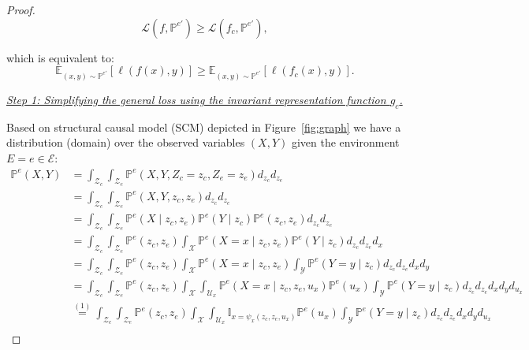 \begin{proof}
\begin{equation}
\mathcal{L}\left(f, \mathbb{P}^{e'}\right)
\geq \mathcal{L}\left(f_c, \mathbb{P}^{e'}\right),
\end{equation}

which is equivalent to:
\begin{equation}
\mathbb{E}_{(x,y)\sim\mathbb{P}^{e'}}\left[\ell\left(f\left(x\right),y\right)\right]
\geq \mathbb{E}_{(x,y)\sim\mathbb{P}^{e'}}\left[\ell\left(f_c\left(x\right),y\right)\right].
\label{eq:target_apd}
\end{equation}


\underline{\textit{Step 1: Simplifying the general loss using the invariant representation function \(g_c\).}} 

Based on structural causal model (SCM) depicted in Figure~\ref{fig:graph} we have a distribution (domain) over the observed variables $(X,Y)$ given the environment $E=e \in \mathcal{E}$: \begin{align*}  \mathbb{P}^e(X,Y)&=\int_{\mathcal{Z}_c}\int_{\mathcal{Z}_e}\mathbb{P}^{e}(X, Y, Z_c=z_c,Z_e=z_e)d_{z_c} d_{z_e}\\
&=\int_{\mathcal{Z}_c}\int_{\mathcal{Z}_e}\mathbb{P}^{e}(X, Y, z_c,z_e)d_{z_c} d_{z_e}\\
   &= \int_{\mathcal{Z}_c}\int_{\mathcal{Z}_e}\mathbb{P}^{e}(X\mid z_c, z_e)\mathbb{P}^{e}(Y\mid z_c)\mathbb{P}^{e}(z_c,z_e) d_{z_c} d_{z_e}\\
   &= \int_{\mathcal{Z}_c}\int_{\mathcal{Z}_e}\mathbb{P}^{e}(z_c,z_e)\int_{\mathcal{X}}\mathbb{P}^{e}(X=x\mid z_c, z_e)\mathbb{P}^{e}(Y\mid z_c)d_{z_c} d_{z_e} d_x\\
   &= \int_{\mathcal{Z}_c}\int_{\mathcal{Z}_e}\mathbb{P}^{e}(z_c,z_e)\int_{\mathcal{X}}\mathbb{P}^{e}(X=x\mid z_c, z_e)\int_{\mathcal{Y}}\mathbb{P}^{e}(Y=y\mid z_c) d_{z_c} d_{z_e} d_x d_y\\
    &= \int_{\mathcal{Z}_c}\int_{\mathcal{Z}_e}\mathbb{P}^{e}(z_c,z_e)\int_{\mathcal{X}}\int_{\mathcal{U}_x}\mathbb{P}^{e}(X=x\mid z_c, z_e,u_x)\mathbb{P}^{e}(u_x)\int_{\mathcal{Y}}\mathbb{P}^{e}(Y=y\mid z_c)  d_{z_c} d_{z_e} d_x d_y d_{u_x}\\
    &\stackrel{(1)}{=} \int_{\mathcal{Z}_c}\int_{\mathcal{Z}_e}\mathbb{P}^{e}(z_c,z_e)\int_{\mathcal{X}}\int_{\mathcal{U}_x}\mathbb{I}_{x= \psi_x(z_c, z_e,u_x)}\mathbb{P}^{e}(u_x)\int_{\mathcal{Y}}\mathbb{P}^{e}(Y=y\mid z_c)  d_{z_c} d_{z_e} d_x d_y d_{u_x}\\
\end{align*}


\end{proof}
